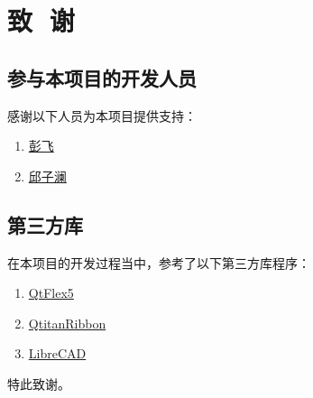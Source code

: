 \chapter{致\,\,\,\,谢}

\section{参与本项目的开发人员}

感谢以下人员为本项目提供支持：
\begin{enumerate}
	\item \href{https://github.com/Poofee}{彭飞}
	\item  \href{https://github.com/QzLancer}{邱子澜}
\end{enumerate}

\section{第三方库}

在本项目的开发过程当中，参考了以下第三方库程序：

\begin{enumerate}
	\item \href{https://github.com/JackyDing/QtFlex5}{QtFlex5}
	\item \href{https://www.devmachines.com/qtitanribbon-overview.html}{QtitanRibbon}
	\item \href{https://github.com/LibreCAD/LibreCAD}{LibreCAD}
\end{enumerate}

特此致谢。
